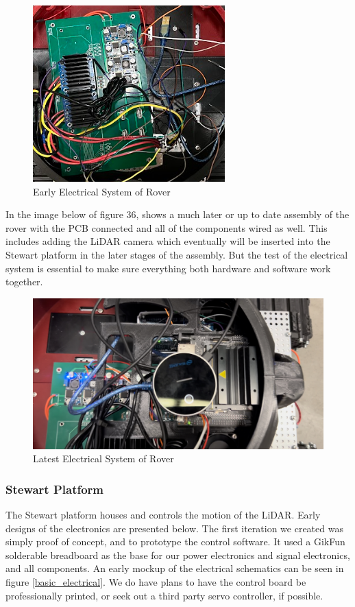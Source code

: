 \documentclass[a4paper, 10pt]{article}
\begin{document}
 		\begin{figure} [!h]
			\centering
			\includegraphics[scale=1.25]{Photos/Rover PCB (Wired)}
			\caption{Early Electrical System of Rover}
		\end{figure}

In the image below of figure 36, shows a much later or up to date assembly of the rover with the PCB connected and all of the components wired as well. This includes adding the LiDAR camera which eventually will be inserted into the Stewart platform in the later stages of the assembly. But the test of the electrical system is essential to make sure everything both hardware and software work together.

\begin{figure} [!h]
			\centering
			\includegraphics[scale=0.25]{Photos/Rover PCB (Assembled)}
			\caption{Latest Electrical System of Rover}
		\end{figure}
 		
 		\subsubsection*{Stewart Platform}
 		The Stewart platform houses and controls the motion of the LiDAR. Early designs of the electronics are presented below. The first iteration we created was simply proof of concept, and to prototype the control software. It used a GikFun solderable breadboard as the base for our power electronics and signal electronics, and all components. An early mockup of the electrical schematics can be seen in figure \ref{basic_electrical}. We do have plans to have the control board be professionally printed, or seek out a third party servo controller, if possible.
 		
\end{document}
